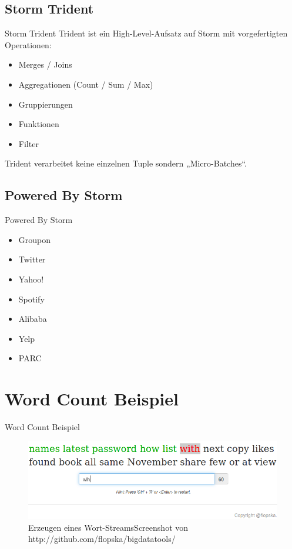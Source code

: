 \documentclass{beamer}
\begin{document}
\subsection{Storm Trident}
\begin{frame}[t]{Storm Trident}
  Trident ist ein High-Level-Aufsatz auf Storm mit vorgefertigten Operationen:
  \begin{itemize}
    \item Merges / Joins
    \item Aggregationen (Count / Sum / Max)
    \item Gruppierungen
    \item Funktionen
    \item Filter
  \end{itemize}
  Trident verarbeitet keine einzelnen Tuple sondern „Micro-Batches“.
\end{frame}

\subsection{Powered By Storm}
\begin{frame}[t]{Powered By Storm}
  \begin{itemize}
    \item Groupon
    \item Twitter
    \item Yahoo!
    \item Spotify
    \item Alibaba
    \item Yelp
    \item PARC
  \end{itemize}
\end{frame}

\section{Word Count Beispiel}
\begin{frame}[t]{Word Count Beispiel}
  \begin{figure}
    \centering
    \includegraphics[scale=0.3,natwidth=750,natheight=234]{img/webapp.png}
    \caption{Erzeugen eines Wort-Streams\hspace{\linewidth}Screenshot von http://github.com/flopska/bigdatatools/}
  \end{figure}
\end{frame}
\end{document}
